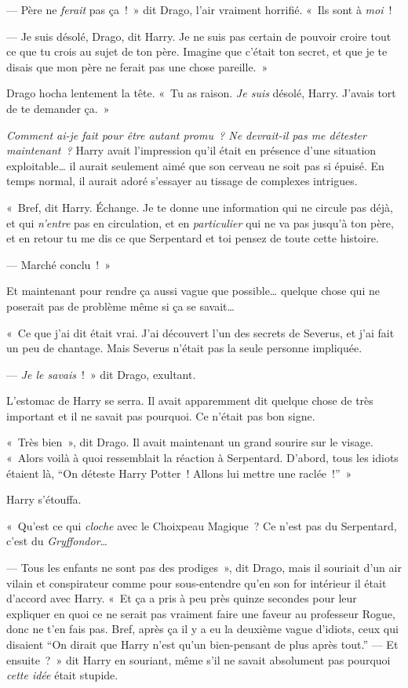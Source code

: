--- Père ne \emph{ferait} pas ça~!~» dit Drago, l'air vraiment horrifié. «~Ils sont à \emph{moi}~!

--- Je suis désolé, Drago, dit Harry. Je ne suis pas certain de pouvoir croire tout ce que tu crois au sujet de ton père. Imagine que c'était ton secret, et que je te disais que mon père ne ferait pas une chose pareille.~»

Drago hocha lentement la tête. «~Tu as raison. \emph{Je suis} désolé, Harry. J'avais tort de te demander ça.~»

\emph{Comment ai-je fait pour être autant promu~? Ne devrait-il pas me détester maintenant~?} Harry avait l'impression qu'il était en présence d'une situation exploitable… il aurait seulement aimé que son cerveau ne soit pas si épuisé. En temps normal, il aurait adoré s'essayer au tissage de complexes intrigues.

«~Bref, dit Harry. Échange. Je te donne une information qui ne circule pas déjà, et qui \emph{n'entre} pas en circulation, et en \emph{particulier} qui ne va pas jusqu'à ton père, et en retour tu me dis ce que Serpentard et toi pensez de toute cette histoire.

--- Marché conclu~!~»

Et maintenant pour rendre ça aussi vague que possible… quelque chose qui ne poserait pas de problème même si ça se savait…

«~Ce que j'ai dit était vrai. J'ai découvert l'un des secrets de Severus, et j'ai fait un peu de chantage. Mais Severus n'était pas la seule personne impliquée.

--- \emph{Je le savais}~!~» dit Drago, exultant.

L'estomac de Harry se serra. Il avait apparemment dit quelque chose de très important et il ne savait pas pourquoi. Ce n'était pas bon signe.

«~Très bien~», dit Drago. Il avait maintenant un grand sourire sur le visage. «~Alors voilà à quoi ressemblait la réaction à Serpentard. D'abord, tous les idiots étaient là, “On déteste Harry Potter~! Allons lui mettre une raclée~!”~»

Harry s'étouffa.

«~Qu'est ce qui \emph{cloche} avec le Choixpeau Magique~? Ce n'est pas du Serpentard, c'est du \emph{Gryffondor}…

--- Tous les enfants ne sont pas des prodiges~», dit Drago, mais il souriait d'un air vilain et conspirateur comme pour sous-entendre qu'en son for intérieur il était d'accord avec Harry. «~Et ça a pris à peu près quinze secondes pour leur expliquer en quoi ce ne serait pas vraiment faire une faveur au professeur Rogue, donc ne t'en fais pas. Bref, après ça il y a eu la deuxième vague d'idiots, ceux qui disaient “On dirait que Harry n'est qu'un bien-pensant de plus après tout.”
--- Et ensuite~?~» dit Harry en souriant, même s'il ne savait absolument pas pourquoi \emph{cette idée} était stupide.

